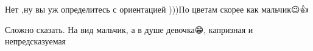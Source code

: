  
 
 
 
 

\qqSecCmt


Нет ,ну вы уж определитесь с ориентацией )))По цветам скорее как мальчик😉👍🌸

\begin{itemize} %

Сложно сказать. На вид мальчик, а в душе девочка😁, капризная и непредсказуемая
\end{itemize} %
